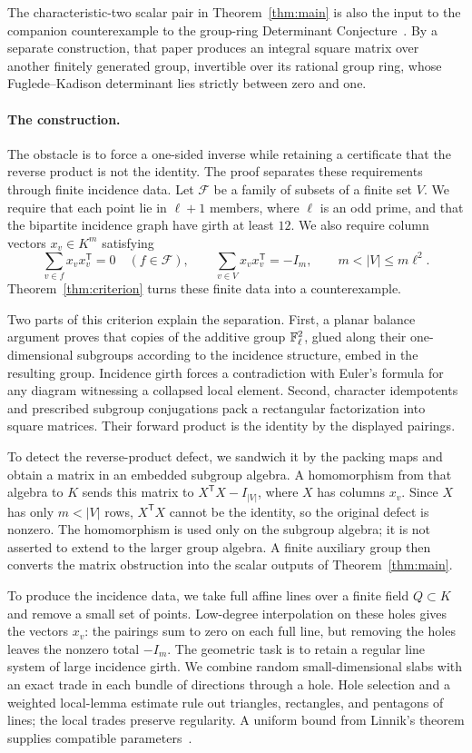 The characteristic-two scalar pair in Theorem~\ref{thm:main} is also the
input to the companion counterexample to the group-ring Determinant
Conjecture~\cite[Theorem~1.1]{DeterminantCompanion}. By a separate
construction, that paper produces an integral square matrix over another
finitely generated group, invertible over its rational group ring, whose
Fuglede--Kadison determinant lies strictly between zero and one.

\paragraph{The construction.}
The obstacle is to force a one-sided inverse while retaining a certificate that the reverse product is not the identity. The proof separates these requirements through finite incidence data. Let $\mathcal F$ be a family of subsets of a finite set $V$. We require that each point lie in $\ell+1$ members, where $\ell$ is an odd prime, and that the bipartite incidence graph have girth at least $12$. We also require column vectors $x_v\in K^m$ satisfying
\[
\sum_{v\in f}x_vx_v^{\mathsf T}=0\quad(f\in\mathcal F),
\qquad \sum_{v\in V}x_vx_v^{\mathsf T}=-I_m,
\qquad m<|V|\le m\ell^2.
\]
Theorem~\ref{thm:criterion} turns these finite data into a counterexample.

Two parts of this criterion explain the separation. First, a planar balance argument proves that copies of the additive group $\mathbb F_\ell^2$, glued along their one-dimensional subgroups according to the incidence structure, embed in the resulting group. Incidence girth forces a contradiction with Euler's formula for any diagram witnessing a collapsed local element. Second, character idempotents and prescribed subgroup conjugations pack a rectangular factorization into square matrices. Their forward product is the identity by the displayed pairings.

To detect the reverse-product defect, we sandwich it by the packing maps and obtain a matrix in an embedded subgroup algebra. A homomorphism from that algebra to $K$ sends this matrix to $X^{\mathsf T}X-I_{|V|}$, where $X$ has columns $x_v$. Since $X$ has only $m<|V|$ rows, $X^{\mathsf T}X$ cannot be the identity, so the original defect is nonzero. The homomorphism is used only on the subgroup algebra; it is not asserted to extend to the larger group algebra. A finite auxiliary group then converts the matrix obstruction into the scalar outputs of Theorem~\ref{thm:main}.

To produce the incidence data, we take full affine lines over a finite field $Q\subset K$ and remove a small set of points. Low-degree interpolation on these holes gives the vectors $x_v$: the pairings sum to zero on each full line, but removing the holes leaves the nonzero total $-I_m$. The geometric task is to retain a regular line system of large incidence girth. We combine random small-dimensional slabs with an exact trade in each bundle of directions through a hole. Hole selection and a weighted local-lemma estimate rule out triangles, rectangles, and pentagons of lines; the local trades preserve regularity. A uniform bound from Linnik's theorem supplies compatible parameters~\cite[Theorem~1.1]{Xylouris2011}.

